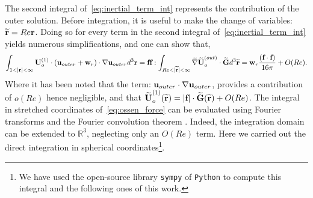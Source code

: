 The second integral of~\ref{eq:inertial_term_int} represents the contribution of the outer solution. 
Before integration, it is useful to make the change of variables: $\widetilde{\textbf{r}} = Re \textbf{r}$. 
Doing so for every term in the second integral of~\ref{eq:inertial_term_int} yields numerous simplifications, and one can show that, 
\begin{equation}
    \int_{1<|\textbf{r}|<\infty}{
    \textbf{U}_{o}^{(1)}\cdot 
    (\textbf{u}_{outer} + \textbf{w}_r)\cdot \grad \textbf{u}_{outer}
    }d^3\textbf{r} 
    =
    \textbf{f} \textbf{f} : \int_{Re<|\wt{\textbf{r}}|<\infty}{
    \wt{\grad} \wt{\textbf{U}}_{o}^{(out)}\cdot \wt{\textbf{G}}
    }  d^3 \wt{\textbf{r}}
    =
    \textbf{w}_r\frac{(\textbf{f}\cdot \textbf{f})}{16\pi} + O(Re).
    \label{eq:ossen_force}
\end{equation}
Where it has been noted that the term: $\textbf{u}_{outer} \cdot \mathbf{\nabla} \textbf{u}_{outer}$, provides a contribution of $o(Re)$ hence negligible, and that $\widetilde{\textbf{U}}_{o}^{(1)}(\widetilde{\textbf{r}}) = |\textbf{f}| \cdot \widetilde{\textbf{G}}(\widetilde{\textbf{r}}) + O(Re)$.
The integral in stretched coordinates of~\ref{eq:ossen_force} can be evaluated using Fourier transforms and the Fourier convolution theorem \citep{stone2001inertial}.
Indeed, the integration domain can be extended to $\mathbb{R}^3$, neglecting only an $O(Re)$ term. 
Here we carried out the direct integration in spherical coordinates\footnote{
    We have used the open-source library \texttt{sympy} of \texttt{Python} to compute this integral and the following ones of this work. 
    }.  


